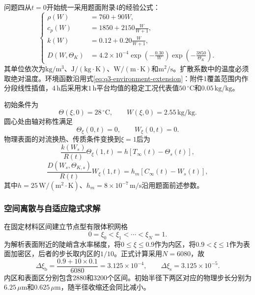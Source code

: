 \documentclass[withoutpreface,bwprint]{cumcmthesis}
\begin{document}
问题四从$t=0$开始统一采用题面附录4的经验公式：
\begin{equation}
\left\{
\begin{aligned}
\rho(W)&=760+90W,\\
c_p(W)&=1850+2150\frac{W}{W+1},\\
k(W)&=0.12+0.20\frac{W}{W+1},\\
D(W,\Theta_K)
&=4.2\times10^{-4}
\exp\!\left(-\frac{0.30}{W}\right)
\exp\!\left(-\frac{3850}{\Theta_K}\right).
\end{aligned}
\right.
\label{eq:q4-properties}
\end{equation}
其单位依次为$\mathrm{kg/m^3}$、$\mathrm{J/(kg\cdot K)}$、$\mathrm{W/(m\cdot K)}$和$\mathrm{m^2/s}$。扩散系数中的温度必须取绝对温度。环境函数沿用式\eqref{eq:q3-environment-extension}：附件1覆盖范围内作分段线性插值，$4\,\mathrm h$后采用末$1\,\mathrm h$平台均值的稳定工况代表值$50\,{}^\circ\mathrm C$和$0.05\,\mathrm{kg/kg}$。

初始条件为
\begin{equation}
\Theta(\xi,0)=28\,{}^\circ\mathrm C,
\qquad
W(\xi,0)=2.55\,\mathrm{kg/kg}.
\label{eq:q4-initial-condition}
\end{equation}
圆心处由轴对称性满足
\begin{equation}
\Theta_\xi(0,t)=0,
\qquad
W_\xi(0,t)=0.
\label{eq:q4-center-boundary}
\end{equation}
物理表面的对流换热、传质条件变换到$\xi=1$后为
\begin{equation}
\frac{k(W_s)}{R(t)}\Theta_\xi(1,t)
=h\left[T_\infty(t)-\Theta_s(t)\right],
\label{eq:q4-surface-heat}
\end{equation}
\begin{equation}
\frac{D(W_s,\Theta_{K,s})}{R(t)}W_\xi(1,t)
=h_m\left[C_\infty(t)-W_s(t)\right],
\label{eq:q4-surface-moisture}
\end{equation}
其中$h=25\,\mathrm{W/(m^2\cdot K)}$、$h_m=8\times10^{-7}\,\mathrm{m/s}$沿用题面前述参数。

\subsubsection{空间离散与自适应隐式求解}

在固定材料区间建立节点型有限体积网格
\begin{equation}
0=\xi_0<\xi_1<\cdots<\xi_N=1.
\label{eq:q4-grid}
\end{equation}
为解析表面附近的陡峭含水率梯度，将$0\le\xi\le0.9$作为内区，将$0.9<\xi\le1$作为表面加密区，后者的步长取内区的$1/10$。正式计算采用$N=6080$，故
\begin{equation}
\Delta\xi_{\mathrm b}
=\frac{0.9+10\times0.1}{6080}
=3.125\times10^{-4},
\qquad
\Delta\xi_{\mathrm s}
=3.125\times10^{-5}.
\label{eq:q4-grid-spacings}
\end{equation}
内区和表面区分别包含$2880$和$3200$个区间。初始半径下两区对应的物理步长分别为$6.25\,\mu\mathrm m$和$0.625\,\mu\mathrm m$，随半径收缩还会同比减小。
\end{document}
